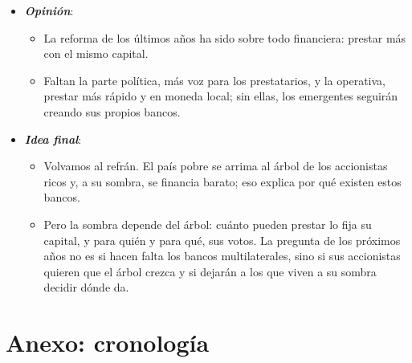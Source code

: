 \documentclass[11pt]{article}
\begin{document}
\begin{itemize}
\begin{itemize}
  \item El clima y su financiación ; la coordinación en el G-20 ; la cooperación de la Unión Europea y el BEI .
  \item España: los instrumentos de apoyo a la internacionalización y las licitaciones multilaterales   y la cooperación española .
  \end{itemize}
\item \textbf{\emph{Opinión}}:
  \begin{itemize}
  \item La reforma de los últimos años ha sido sobre todo financiera: prestar más con el mismo capital.
  \item Faltan la parte política, más voz para los prestatarios, y la operativa, prestar más rápido y en moneda local; sin ellas, los emergentes seguirán creando sus propios bancos.
  \end{itemize}
\item \textbf{\emph{Idea final}}:
  \begin{itemize}
  \item Volvamos al refrán. El país pobre se arrima al árbol de los accionistas ricos y, a su sombra, se financia barato; eso explica por qué existen estos bancos.
  \item Pero la sombra depende del árbol: cuánto pueden prestar lo fija su capital, y para quién y para qué, sus votos. La pregunta de los próximos años no es si hacen falta los bancos multilaterales, sino si sus accionistas quieren que el árbol crezca y si dejarán a los que viven a su sombra decidir dónde da.
  \end{itemize}
\end{itemize}

\clearpage
\appendix

\section{Anexo: cronología}\label{anexo:cronologia}
\end{document}
